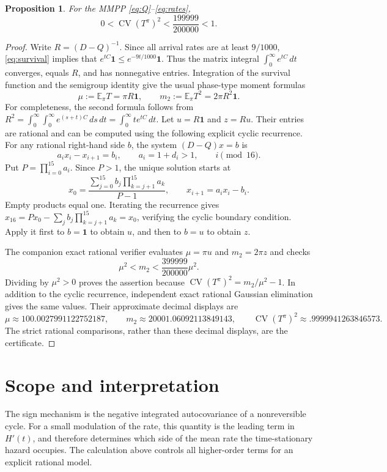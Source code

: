 \documentclass[11pt]{article}
\newtheorem{proposition}{Proposition}
\newcommand{\one}{\mathbf 1}
\newcommand{\EE}{\mathbb E}
\newcommand{\CV}{\operatorname{CV}}
\begin{document}
\begin{proposition}\label{prop:scv}
For the MMPP \eqref{eq:Q}--\eqref{eq:rates},
\[
 0<\CV(T^\pi)^2<\frac{199999}{200000}<1.
\]
\end{proposition}
\begin{proof}
Write $R=(D-Q)^{-1}$. Since all arrival rates are at least $9/1000$,
\eqref{eq:survival} implies that $e^{tC}\one\leq e^{-9t/1000}\one$.
Thus the matrix integral $\int_0^\infty e^{tC}\,dt$ converges, equals
$R$, and has nonnegative entries. Integration of the survival function
and the semigroup identity give the usual phase-type moment formulas
\[
 \mu:=\EE_\pi T=\pi R\one,\qquad
 m_2:=\EE_\pi T^2=2\pi R^2\one.
\]
For completeness, the second formula follows from
$R^2=\int_0^\infty\int_0^\infty e^{(s+t)C}\,ds\,dt
=\int_0^\infty t e^{tC}\,dt$.
Let $u=R\one$ and $z=Ru$. Their entries are rational and can be
computed using the following explicit cyclic recurrence. For any
rational right-hand side $b$, the system $(D-Q)x=b$ is
\[
 a_i x_i-x_{i+1}=b_i,\qquad a_i=1+d_i>1,
 \qquad i\pmod{16}.
\]
Put $P=\prod_{i=0}^{15}a_i$. Since $P>1$, the unique solution starts at
\[
 x_0=\frac{\displaystyle\sum_{j=0}^{15}b_j
                    \prod_{k=j+1}^{15}a_k}{P-1},
 \qquad x_{i+1}=a_ix_i-b_i.
\]
Empty products equal one. Iterating the recurrence gives
$x_{16}=Px_0-\sum_j b_j\prod_{k=j+1}^{15}a_k=x_0$, verifying the
cyclic boundary condition. Apply it first to $b=\one$ to obtain $u$,
and then to $b=u$ to obtain $z$.

The companion exact rational verifier evaluates $\mu=\pi u$ and
$m_2=2\pi z$ and checks
\[
 \mu^2<m_2<\frac{399999}{200000}\mu^2.
\]
Dividing by $\mu^2>0$ proves the assertion because
$\CV(T^\pi)^2=m_2/\mu^2-1$. In addition to the cyclic recurrence,
independent exact rational Gaussian elimination gives the same values.
Their approximate decimal displays are
\[
 \mu\approx100.0027991122752187,\qquad
 m_2\approx20001.06092113849143,\qquad
 \CV(T^\pi)^2\approx .9999941263846573.
\]
The strict rational comparisons, rather than these decimal displays,
are the certificate.
\end{proof}

\section{Scope and interpretation}
The sign mechanism is the negative integrated autocovariance of a
nonreversible cycle. For a small modulation of the rate, this quantity
is the leading term in $H'(t)$, and therefore determines which side
of the mean rate the time-stationary hazard occupies. The calculation
above controls all higher-order terms for an explicit rational model.
\end{document}
